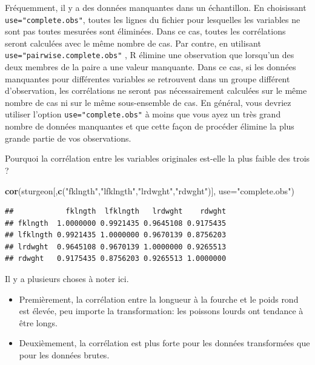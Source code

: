 \documentclass[12pt,]{book}
\newenvironment{Shaded}{\begin{snugshade}}{\end{snugshade}}
\newcommand{\DataTypeTok}[1]{\textcolor[rgb]{0.27,0.27,0.27}{#1}}
\newcommand{\KeywordTok}[1]{\textcolor[rgb]{0.27,0.27,0.27}{\textbf{#1}}}
\newcommand{\NormalTok}[1]{#1}
\newcommand{\StringTok}[1]{\textcolor[rgb]{0.5,0.5,0.5}{#1}}
\providecommand{\tightlist}{%
  \setlength{\itemsep}{0pt}\setlength{\parskip}{0pt}}
\begin{document}
Fréquemment, il y a des données manquantes dans un échantillon.
En choisissant \texttt{use="complete.obs"}, toutes les lignes du fichier pour lesquelles les variables ne sont pas toutes mesurées sont éliminées.
Dans ce cas, toutes les corrélations seront calculées avec le même nombre de cas.
Par contre, en utilisant \texttt{use="pairwise.complete.obs"} ,
R élimine une observation que lorsqu'un des deux membres de la paire a une valeur manquante.
Dans ce cas, si les données manquantes pour différentes variables se retrouvent dans un groupe différent d'observation, les corrélations ne seront pas nécessairement calculées sur le même nombre de cas ni sur le même sous-ensemble de cas.
En général, vous devriez utiliser l'option \texttt{use="complete.obs"} à moins que vous ayez un très grand nombre de données manquantes et que cette façon de procéder élimine la plus grande partie de vos
observations.

Pourquoi la corrélation entre les variables originales est-elle la plus faible des trois ?

\begin{Shaded}
\begin{Highlighting}[]
\KeywordTok{cor}\NormalTok{(sturgeon[,}\KeywordTok{c}\NormalTok{(}\StringTok{"fklngth"}\NormalTok{,}\StringTok{"lfklngth"}\NormalTok{,}\StringTok{"lrdwght"}\NormalTok{,}\StringTok{"rdwght"}\NormalTok{)], }\DataTypeTok{use=}\StringTok{"complete.obs"}\NormalTok{)}
\end{Highlighting}
\end{Shaded}

\begin{verbatim}
##            fklngth  lfklngth   lrdwght    rdwght
## fklngth  1.0000000 0.9921435 0.9645108 0.9175435
## lfklngth 0.9921435 1.0000000 0.9670139 0.8756203
## lrdwght  0.9645108 0.9670139 1.0000000 0.9265513
## rdwght   0.9175435 0.8756203 0.9265513 1.0000000
\end{verbatim}

Il y a plusieurs choses à noter ici.

\begin{itemize}
\tightlist
\item
  Premièrement, la corrélation entre la longueur à la fourche et le poids rond est élevée, peu importe la transformation: les poissons lourds ont tendance à être longs.
\item
  Deuxièmement, la corrélation est plus forte pour les données
  transformées que pour les données brutes.
\end{itemize}
\end{document}
